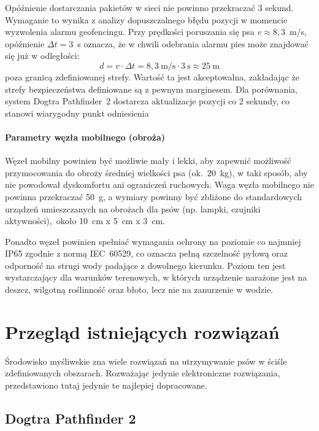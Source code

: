  Opóźnienie dostarczania pakietów w sieci nie powinno przekraczać 3 sekund.
Wymaganie to wynika z analizy dopuszczalnego błędu pozycji w momencie wyzwolenia alarmu
geofencingu. Przy prędkości poruszania się psa $v \approx 8{,}3$~m/s, opóźnienie
$\Delta t = 3$~s oznacza, że w chwili odebrania alarmu pies może znajdować się już
w odległości:
\begin{equation}
d = v \cdot \Delta t = 8{,}3~\text{m/s} \cdot 3~\text{s} \approx 25~\text{m}
\end{equation}
poza granicą zdefiniowanej strefy. Wartość ta jest akceptowalna, zakładając że strefy
bezpieczeństwa definiowane są z pewnym marginesem. Dla porównania, system Dogtra
Pathfinder~2 dostarcza aktualizacje pozycji co 2 sekundy, co stanowi wiarygodny punkt odniesienia


\paragraph{Parametry węzła mobilnego (obroża)}

Węzeł mobilny powinien być możliwie mały i lekki, aby zapewnić możliwość przymocowania
do obroży średniej wielkości psa (ok.\ 20~kg), w taki sposób, aby nie powodował dyskomfortu ani ograniczeń ruchowych.
Waga węzła mobilnego nie powinna przekraczać 50~g, a wymiary powinny być zbliżone do 
standardowych urządzeń umieszczanych na obrożach dla psów (np. lampki, czujniki aktywności),\ około 10~cm x 5~cm x 3~cm.

Ponadto węzeł powinien spełniać wymagania ochrony na poziomie co najmniej IP65
zgodnie z normą IEC~60529, co oznacza pełną szczelność pyłową oraz odporność
na strugi wody padające z dowolnego kierunku. Poziom ten jest wystarczający
dla warunków terenowych, w których urządzenie narażone jest na deszcz,
wilgotną roślinność oraz błoto, lecz nie na zanurzenie w wodzie.



\section{Przegląd istniejących rozwiązań}

Środowisko myśliwskie zna wiele rozwiązań na utrzymywanie psów w ściśle zdefiniowanych obszarach.
Rozważając jedynie elektroniczne rozwiązania, przedstawiono tutaj jedynie te najlepiej dopracowane.

\subsection*{Dogtra Pathfinder 2}

